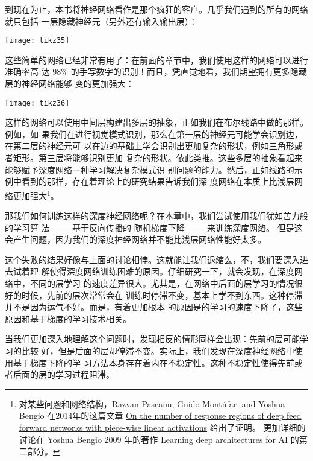 到现在为止，本书将神经网络看作是那个疯狂的客户。几乎我们遇到的所有的网络就只包括
一层隐藏神经元（另外还有输入输出层）：
\begin{center}
  \texttt{[image: tikz35]}
\end{center}

这些简单的网络已经非常有用了：在前面的章节中，我们使用这样的网络可以进行准确率高
达 98\% 的手写数字的识别！而且，凭直觉地看，我们期望拥有更多隐藏层的神经网络能够
变的更加强大：
\begin{center}
  \texttt{[image: tikz36]}
\end{center}

这样的网络可以使用中间层构建出多层的抽象，正如我们在布尔线路中做的那样。例如，如
果我们在进行视觉模式识别，那么在第一层的神经元可能学会识别边，在第二层的神经元可
以在边的基础上学会识别出更加复杂的形状，例如三角形或者矩形。第三层将能够识别更加
复杂的形状。依此类推。这些多层的抽象看起来能够赋予深度网络一种学习解决复杂模式识
别问题的能力。然后，正如线路的示例中看到的那样，存在着理论上的研究结果告诉我们深
度网络在本质上比浅层网络更加强大\footnote{对某些问题和网络结构，Razvan Pascanu,
  Guido Montúfar, and Yoshua Bengio 在2014年的这篇文章
  \href{http://arxiv.org/pdf/1312.6098.pdf}{On the number of response regions of
    deep feed forward networks with piece-wise linear activations} 给出了证明。
  更加详细的讨论在 Yoshua Bengio 2009 年的著作
  \href{http://www.iro.umontreal.ca/~bengioy/papers/ftml_book.pdf}{Learning deep
    architectures for AI} 的第二部分。}。
 
那我们如何训练这样的深度神经网络呢？在本章中，我们尝试使用我们犹如苦力般的学习算
法 —— 基于\hyperref[ch:HowTheBackpropagationAlgorithmWorks]{反向传播}的%
\hyperref[sec:learning_with_gradient_descent]{随机梯度下降} —— 来训练深度网络。
但是这会产生问题，因为我们的深度神经网络并不能比浅层网络性能好太多。
 
这个失败的结果好像与上面的讨论相悖。这就能让我们退缩么，不，我们要深入进去试着理
解使得深度网络训练困难的原因。仔细研究一下，就会发现，在深度网络中，不同的层学习
的速度差异很大。尤其是，在网络中后面的层学习的情况很好的时候，先前的层次常常会在
训练时停滞不变，基本上学不到东西。这种停滞并不是因为运气不好。而是，有着更加根本
的原因是的学习的速度下降了，这些原因和基于梯度的学习技术相关。
 
当我们更加深入地理解这个问题时，发现相反的情形同样会出现：先前的层可能学习的比较
好，但是后面的层却停滞不变。实际上，我们发现在深度神经网络中使用基于梯度下降的学
习方法本身存在着内在不稳定性。这种不稳定性使得先前或者后面的层的学习过程阻滞。
 
